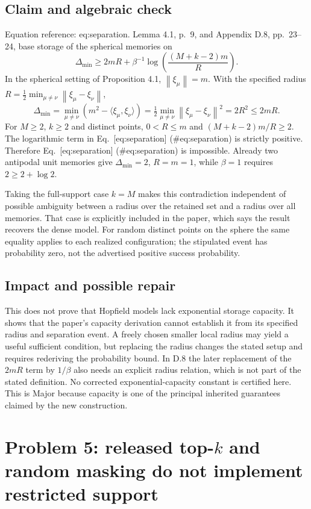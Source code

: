 \documentclass[10pt]{article}
\begin{document}
\subsection*{Claim and algebraic check}
Equation reference: eq:separation. Lemma 4.1, p. 9, and Appendix D.8, pp. 23–24, base storage of the spherical memories on \[
 \Delta_{\min}\ge
 2mR+\beta^{-1}\log\left(\frac{(M+k-2)m}{R}\right).\] In the spherical setting of Proposition 4.1, \(\left\lVert \xi_\mu\right\rVert=m\). With the specified radius \(R=\frac12\min_{\mu\ne\nu}\left\lVert \xi_\mu-\xi_\nu\right\rVert\), \[\Delta_{\min}
 =\min_{\mu\ne\nu}(m^2-\langle\xi_\mu,\xi_\nu\rangle)
 =\tfrac12\min_{\mu\ne\nu}\left\lVert \xi_\mu-\xi_\nu\right\rVert^2
 =2R^2\le2mR .\] For \(M\ge2\), \(k\ge2\) and distinct points, \(0<R\le m\) and \((M+k-2)m/R\ge2\). The logarithmic term in Eq. [eq:separation] (\#eq:separation) is strictly positive. Therefore Eq. [eq:separation] (\#eq:separation) is impossible. Already two antipodal unit memories give \(\Delta_{\min}=2\), \(R=m=1\), while \(\beta=1\) requires \(2\ge2+\log 2\).\par
Taking the full-support case \(k=M\) makes this contradiction independent of possible ambiguity between a radius over the retained set and a radius over all memories. That case is explicitly included in the paper, which says the result recovers the dense model. For random distinct points on the sphere the same equality applies to each realized configuration; the stipulated event has probability zero, not the advertised positive success probability.\par
\subsection*{Impact and possible repair}
This does not prove that Hopfield models lack exponential storage capacity. It shows that the paper’s capacity derivation cannot establish it from its specified radius and separation event. A freely chosen smaller local radius may yield a useful sufficient condition, but replacing the radius changes the stated setup and requires rederiving the probability bound. In D.8 the later replacement of the \(2mR\) term by \(1/\beta\) also needs an explicit radius relation, which is not part of the stated definition. No corrected exponential-capacity constant is certified here. This is Major because capacity is one of the principal inherited guarantees claimed by the new construction.\par
\section*{Problem 5: released top-\(k\) and random masking do not implement restricted support}
\end{document}
